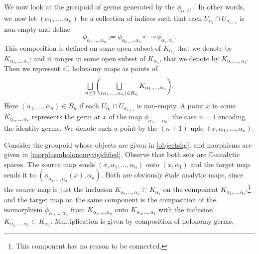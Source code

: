 \documentclass[JEP,XML,SOM,Unicode]{cedram}
\let\oldbigsqcup\bigsqcup
\renewcommand{\bigsqcup}{\mathop{\textstyle\oldbigsqcup}\displaylimits}
\theoremstyle{plain}
\theoremstyle{definition}
\theoremstyle{remark}
\numberwithin{equation}{section}
\newcommand{\CC}{{\mathbb{C}}}
\let\uniondisjointe\bigsqcup
\begin{document}
We now look at the groupoid of germs generated by the $\phi_{\alpha,\beta}$, \cf \cite[1.2]{Ha}. In other words, we now let $(\alpha_1,\hdots,\alpha_n)$ be a collection of indices such that each $U_{\alpha_i}\cap U_{\alpha_{i+1}}$ is non-empty and define\vspace*{-3pt}
\begin{equation}
\label{phialpha1n}
\phi_{\alpha_1,\hdots,\alpha_n}:=\phi_{\alpha_{n-1},\alpha_n}\circ\cdots\circ \phi_{\alpha_1,\alpha_2}.
\end{equation}
This composition is defined on some open subset of $K_{\alpha_1}$ that we denote by $K_{\alpha_1,\hdots,\alpha_n}$; and it ranges in some open subset of $K_{\alpha_n}$, that we denote by $K_{\alpha_n,\hdots, \alpha_1}$. Then we represent all holonomy maps as
points of
\begin{equation}
\label{morphismholonomyrigidified}
\uniondisjointe_{n\geq 1}\biggl (\uniondisjointe_{(\alpha_1,\hdots,\alpha_n) \in B_{n}} K_{\alpha_1,\hdots,\alpha_n}\biggr ).
\end{equation}
Here $(\alpha_1,\hdots,\alpha_n) \in B_{n}$ if each $U_{\alpha_i}\cap U_{\alpha_{i+1}}$ is non-empty.
A point $x$ in some $K_{\alpha_1,\hdots,\alpha_n}$ represents the germ at $x$ of the map $\phi_{\alpha_1,\hdots,\alpha_n}$, the case $n=1$ encoding the identity
germs. We denote such a point by the $(n+1)$-uple $(x,\alpha_1,\hdots,\alpha_n)$.

Consider the groupoid whose objects are given in \eqref{objectshg}, and morphisms are given in \eqref{morphismholonomyrigidified}. Observe that both sets are $\CC$-analytic spaces. The source map sends $(x,\alpha_1,\hdots, \alpha_n)$ onto $(x,\alpha_1)$ and the target map sends it to $(\phi_{\alpha_1,\hdots,\alpha_n}(x),\alpha_n)$. Both are obviously étale analytic maps, since the source map is just the inclusion $K_{\alpha_1,\hdots,\alpha_n}\subset K_{\alpha_1}$ on the component $K_{\alpha_1,\hdots,\alpha_n}$;\footnote{This component has no reason to be connected.} and the target map on the same component is the composition of the isomorphism $\phi_{\alpha_1,\hdots,\alpha_n}$ from $K_{\alpha_1,\hdots,\alpha_n}$ onto $K_{\alpha_n,\hdots,\alpha_1}$ with the inclusion $K_{\alpha_n,\hdots,\alpha_1}\subset K_{\alpha_n}$. Multiplication is given by composition of holonomy germs.
\end{document}
